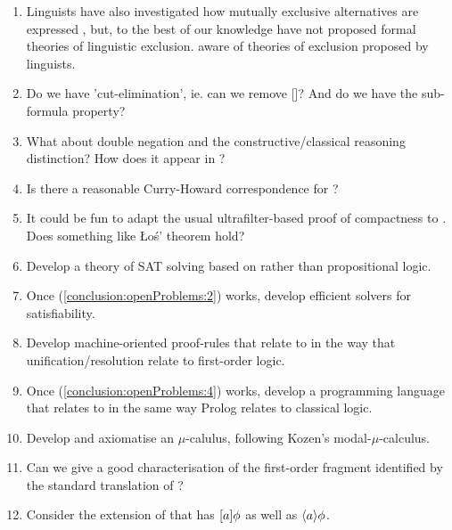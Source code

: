 \begin{enumerate}

\item Linguists have also investigated how mutually exclusive
  alternatives are expressed \cite[Chapter ??? See John's email]{OKeeffeA:rouhanocl}, but, to the best of our knowledge  have not proposed
  formal theories of linguistic exclusion.
  aware of theories of exclusion proposed by linguists.

\item Do we have 'cut-elimination', ie. can we remove
  []?  And do we have the sub-formula property?

\item What about double negation and the constructive/classical
  reasoning distinction?  How does it appear in \ELABR{}?

\item Is there a reasonable Curry-Howard correspondence for \ELFULL{}?

\item It could be fun to adapt the usual ultrafilter-based proof of compactness 
  to \ELABR{}. Does something like \L{}o\'{s}' theorem hold?

\item\label{conclusion:openProblems:2}  Develop a theory of SAT solving based on \ELABR{} rather than
  propositional logic.

\item Once (\ref{conclusion:openProblems:2}) works, develop efficient
  solvers for \ELABR{} satisfiability.

\item\label{conclusion:openProblems:4} Develop machine-oriented proof-rules that relate to \ELABR{}
  in the way that unification/resolution relate to first-order logic.

\item Once (\ref{conclusion:openProblems:4}) works, develop a
  programming language that relates to \ELABR{} in the same way
  Prolog relates to classical logic.

\item Develop and axiomatise an \ELABR{} $\mu$-calulus, following
  Kozen's modal-$\mu$-calculus.

\item Can we give a good characterisation of the first-order fragment
  identified by the standard translation of \ELFULL{}?
  
  \item Consider the extension of \ELABR{} that has $[ a ] \phi$ as well as $\langle a \rangle \phi$.

\end{enumerate}

